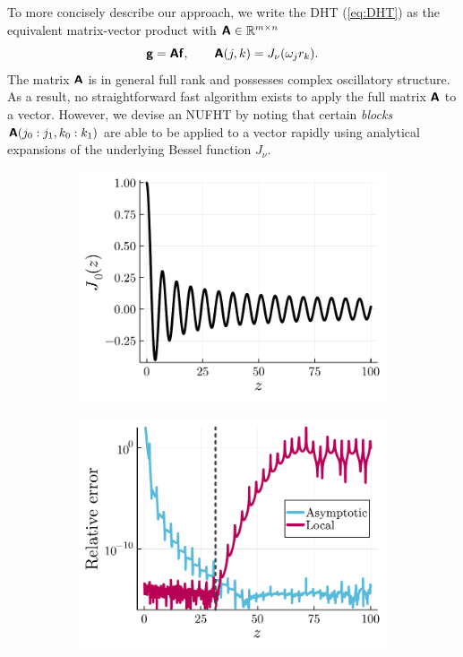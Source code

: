 
To more concisely describe our approach, we write the DHT (\ref{eq:DHT}) as the
equivalent matrix-vector product with $\bm{\mathsf{A}} \in \mathbb{R}^{m \times n}$
\begin{equation}
    \bm{\mathsf{g}} = \bm{\mathsf{A}}\bm{\mathsf{f}}, \qquad \bm{\mathsf{A}}(j,k) = J_\nu(\omega_j r_k).
\end{equation}
The matrix $\bm{\mathsf{A}}$ is in general full rank and possesses complex oscillatory
structure. As a result, no straightforward fast algorithm exists to apply the
full matrix $\bm{\mathsf{A}}$ to a vector. However, we devise an NUFHT by noting that
certain \textit{blocks} $\bm{\mathsf{A}}(j_0:j_1, k_0:k_1)$ are able to be applied to a
vector rapidly using analytical expansions of the underlying Bessel function
$J_\nu$. 

\begin{figure}[!t]
  \centering
  \begin{subfigure}[b]{0.45\textwidth}
    \includegraphics[width=\textwidth]{./figures/bessel_function.pdf}
  \end{subfigure}
  \begin{subfigure}[b]{0.45\textwidth}
    \includegraphics[width=\textwidth]{./figures/pointwise_errors.pdf}

\end{subfigure}
\end{figure}
